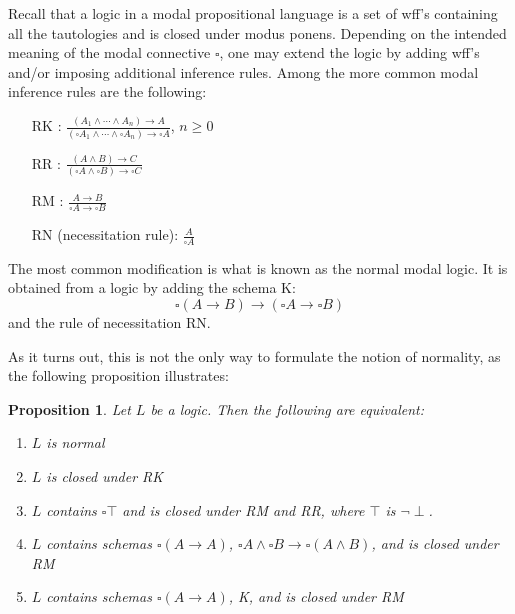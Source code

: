 \documentclass[12pt]{article}
\newtheorem{prop}{Proposition}
\begin{document}
Recall that a logic in a modal propositional language is a set of wff's containing all the tautologies and is closed under modus ponens.  Depending on the intended meaning of the modal connective $\square$, one may extend the logic by adding wff's and/or imposing additional inference rules.  Among the more common modal inference rules are the following: 
\begin{multicols}{2}{
\begin{enumerate}
\item [RK]: $\displaystyle{\frac{(A_1 \wedge \cdots \wedge A_n) \to A}{(\square A_1 \wedge \cdots \wedge \square A_n)\to \square A}}$, $n\ge 0$
\item [RR]: $\displaystyle{\frac{(A \wedge B) \to C}{(\square A \wedge \square B)\to \square C}}$
\item [RM]: $\displaystyle{\frac{A \to B}{\square A \to \square B}}$
\item [RN](necessitation rule): $\displaystyle{\frac{A}{\square A}}$
\end{enumerate}
}
\end{multicols}
The most common modification is what is known as the normal modal logic.  It is obtained from a logic by adding the schema K: $$\square (A\to B)\to (\square A \to \square B)$$
and the rule of necessitation RN.

As it turns out, this is not the only way to formulate the notion of normality, as the following proposition illustrates:
\begin{prop}  Let $L$ be a logic.  Then the following are equivalent:
\begin{enumerate}
\item $L$ is normal
\item $L$ is closed under RK
\item $L$ contains $\square \top$ and is closed under RM and RR, where $\top$ is $\neg \perp$.
\item $L$ contains schemas $\square (A\to A)$, $\square A \land \square B \to \square (A\land B)$, and is closed under RM
\item $L$ contains schemas $\square (A\to A)$, K, and is closed under RM
\end{enumerate}
\end{prop}
\end{document}
